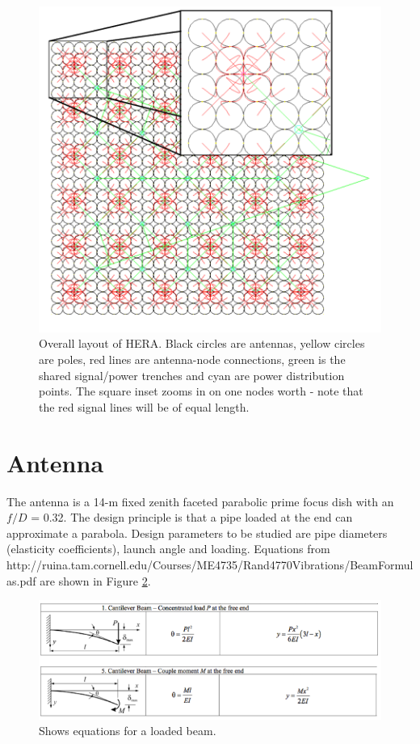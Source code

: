 \documentclass[11pt]{article}
\begin{document}
\begin{figure}[H]
\centering
\includegraphics[width=12cm]{heraconfig576.png}
\caption{Overall layout of HERA.  Black circles are antennas, yellow circles are poles, red lines are antenna-node connections,  green is the shared signal/power trenches and cyan are power distribution points.  The square inset zooms in on one nodes worth - note that the red signal lines will be of equal length. }
\label{fig:heraconfig576}
\end{figure}

\section{Antenna}
The antenna is a 14-m fixed zenith faceted parabolic prime focus dish with an $f/D$ = 0.32.  The design principle is that a pipe loaded at the end can approximate a parabola.  Design parameters to be studied are pipe diameters (elasticity coefficients), launch angle and loading. Equations from
http://ruina.tam.cornell.edu/Courses/ME4735/Rand4770Vibrations/BeamFormulas.pdf
are shown in Figure \ref{fig:beam}.

\begin{figure}[H]
\centering
\includegraphics[width=\textwidth]{beam.png}
\caption{Shows equations for a loaded beam.}
\label{fig:beam}
\end{figure}
\end{document}
